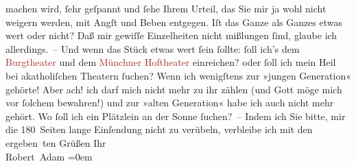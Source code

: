                     machen wird, ſehr geſpannt und ſehe Ihrem Urteil, das Sie mir ja wohl nicht
                    weigern werden, mit Angſt und Beben entgegen. Iſt das Ganze als Ganzes etwas
                    wert oder nicht? Daß mir gewiſſe Einzelheiten nicht mißlungen ſind, glaube ich
                    allerdings. –\pend
           \pstart
           Und wenn das Stück etwas wert {\pb}ſein ſollte: ſoll
                    ich’s dem \textcolor{brown}{Burgtheater}{}\ledrightnote{\textcolor{brown}{Burgtheater}} und dem \textcolor{brown}{Münchner Hoftheater}{}\ledrightnote{\textcolor{brown}{Königliche Hof- und Nationaltheater München}} einreichen? oder ſoll ich mein Heil bei
                    akatholiſchen Theatern ſuchen?\pend
           \pstart
           Wenn ich wenigſtens zur »jungen Generation« gehörte! Aber ach! ich darf mich
                    nicht mehr zu ihr zählen (und Gott möge mich vor ſolchem bewahren!) und zur
                    »alten Generation« habe ich auch nicht mehr gehört. Wo ſoll ich ein Plätzlein an
                    der Sonne ſuchen? –\pend
           \pstart
           Indem ich Sie bitte, mir die 180 Seiten lange Einſendung nicht zu verübeln,
                    verbleibe ich mit den ergeben ten Grüßen Ihr{\\[\baselineskip]}\spacefill\mbox{Robert Adam}\pend
           \leftskip=0em{}\endnumbering{}  
      